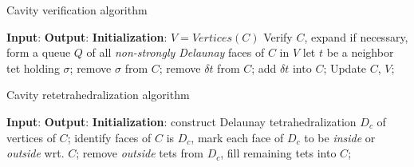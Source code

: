 \documentclass{beamer}
\begin{document}
\begin{frame}{Cavity verification algorithm}
\begin{algorithm}[H]
\caption{Cavity verification/expansion}
\begin{algorithmic}[1]
    \tiny{
    \State \textbf{Input}: 
    \State \textbf{Output}:
    \State \textbf{Initialization}: $V = Vertices(C)$
    \State Verify $C$, expand if necessary,
    \Repeat
    \State form a queue $Q$ of all \textit{non-strongly Delaunay} faces of $C$ in $V$
        \State let $t$ be a neighbor tet holding $\sigma$;
        \State remove $\sigma$ from $C$;
                \State remove $\delta t$ from $C$;
            \Else
                \State add $\delta t$ into $C$; 
            \EndIf
        \EndFor
        \State Update $C$, $V$;
    \EndFor
    \EndProcedure
    }
\end{algorithmic}
\end{algorithm}
\end{frame}

\begin{frame}{Cavity retetrahedralization algorithm}
\begin{algorithm}[H]
\caption{Refill cavity}
\begin{algorithmic}[1]
    \State \textbf{Input}:
    \State \textbf{Output}:
    \State \textbf{Initialization}:
    \State construct Delaunay tetrahedralization $D_c$ of vertices of $C$;
    \State identify faces of $C$ is $D_c$, mark each face of $D_c$ to be \textit{inside} or \textit{outside} wrt. $C$;
    \State remove \textit{outside} tets from $D_c$, fill remaining tets into $C$;
    \EndProcedure
\end{algorithmic}
\end{algorithm}
\end{frame}
\end{document}
